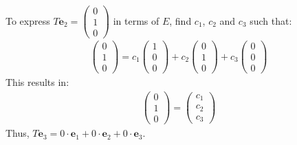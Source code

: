 \begin{enumerate}
\begin{enumerate}[label={(\alph*)}]
    To express $T \mathbf{e}_2 = \begin{pmatrix} 0 \\ 1 \\ 0 \end{pmatrix}$ in terms of $E$, find $c_1$, $c_2$ and $c_3$ such that:
    \begin{align*}
        \begin{pmatrix} 0 \\ 1 \\ 0 \end{pmatrix} = c_1 \begin{pmatrix} 1 \\ 0 \\ 0 \end{pmatrix} + c_2 \begin{pmatrix} 0 \\ 1 \\ 0 \end{pmatrix} + c_3 \begin{pmatrix} 0 \\ 0 \\ 0 \end{pmatrix}
    \end{align*}
    This results in:
    \begin{align*}
        \begin{pmatrix} 0 \\ 1 \\ 0 \end{pmatrix} = \begin{pmatrix} c_1 \\ c_2 \\ c_3 \end{pmatrix}
    \end{align*}
    Thus, $T \mathbf{e}_3 = 0 \cdot \mathbf{e}_1 + 0 \cdot \mathbf{e}_2 + 0 \cdot \mathbf{e}_3$.
    

\end{enumerate}
\end{enumerate}
